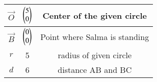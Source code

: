 
\begin{tabular}[]{|c|c|c|}
\hline
$\vec{O}$	& $\begin{pmatrix}5\\0\end{pmatrix}$ &Center of the given circle \\ \hline
$\vec{B}$	& $\begin{pmatrix}0\\0\end{pmatrix}$ &Point where Salma is standing\\ \hline
$r$		& 5 & radius of given circle \\ \hline
$d$ 		& 6 & distance AB and BC\\ \hline
\end{tabular}
